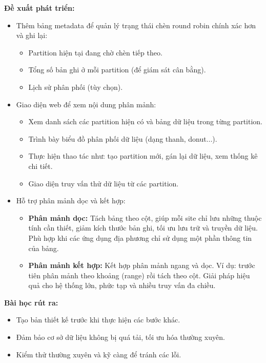 \documentclass[14pt]{extarticle}
\begin{document}
\textbf{Đề xuất phát triển:}
\begin{itemize}
    \item Thêm bảng metadata để quản lý trạng thái chèn round robin chính xác hơn và ghi lại:
    \begin{itemize}
        \item Partition hiện tại đang chờ chèn tiếp theo.
        \item Tổng số bản ghi ở mỗi partition (để giám sát cân bằng).
        \item Lịch sử phân phối (tùy chọn).
    \end{itemize}
    \item Giao diện web để xem nội dung phân mảnh:
    \begin{itemize}
        \item Xem danh sách các partition hiện có và bảng dữ liệu trong từng partition.
        \item Trình bày biểu đồ phân phối dữ liệu (dạng thanh, donut...).
        \item Thực hiện thao tác như: tạo partition mới, gán lại dữ liệu, xem thống kê chi tiết.
        \item Giao diện truy vấn thử dữ liệu từ các partition.
    \end{itemize}
    \item Hỗ trợ phân mảnh dọc và kết hợp:
    \begin{itemize}
        \item \textbf{Phân mảnh dọc:} Tách bảng theo cột, giúp mỗi site chỉ lưu những thuộc tính cần thiết, giảm kích thước bản ghi, tối ưu lưu trữ và truyền dữ liệu. Phù hợp khi các ứng dụng địa phương chỉ sử dụng một phần thông tin của bảng.
        \item \textbf{Phân mảnh kết hợp:} Kết hợp phân mảnh ngang và dọc. Ví dụ: trước tiên phân mảnh theo khoảng (range) rồi tách theo cột. Giải pháp hiệu quả cho hệ thống lớn, phức tạp và nhiều truy vấn đa chiều.
    \end{itemize}
\end{itemize}

\textbf{Bài học rút ra:}
\begin{itemize}
    \item Tạo bản thiết kế trước khi thực hiện các bước khác.
    \item Đảm bảo cơ sở dữ liệu không bị quá tải, tối ưu hóa thường xuyên.
    \item Kiểm thử thường xuyên và kỹ càng để tránh các lỗi.
\end{itemize}
\clearpage
\end{document}

